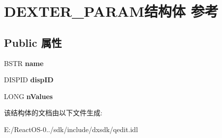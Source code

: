 \hypertarget{struct_d_e_x_t_e_r___p_a_r_a_m}{}\section{D\+E\+X\+T\+E\+R\+\_\+\+P\+A\+R\+A\+M结构体 参考}
\label{struct_d_e_x_t_e_r___p_a_r_a_m}
\subsection*{Public 属性}
\begin{DoxyCompactItemize}
\item 
\mbox{\label{struct_d_e_x_t_e_r___p_a_r_a_m_a94421acae91b4667fa2bc4be574fd193}} 
B\+S\+TR {\bfseries name}
\item 
\mbox{\label{struct_d_e_x_t_e_r___p_a_r_a_m_ac9d1f99937bac1495ab7ccd8d649c178}} 
D\+I\+S\+P\+ID {\bfseries disp\+ID}
\item 
\mbox{\label{struct_d_e_x_t_e_r___p_a_r_a_m_a21889d4acaa6cd9aec98f9c57b83ce07}} 
L\+O\+NG {\bfseries n\+Values}
\end{DoxyCompactItemize}


该结构体的文档由以下文件生成\+:\begin{DoxyCompactItemize}
\item 
E\+:/\+React\+O\+S-\/0../sdk/include/dxsdk/qedit.\+idl\end{DoxyCompactItemize}
